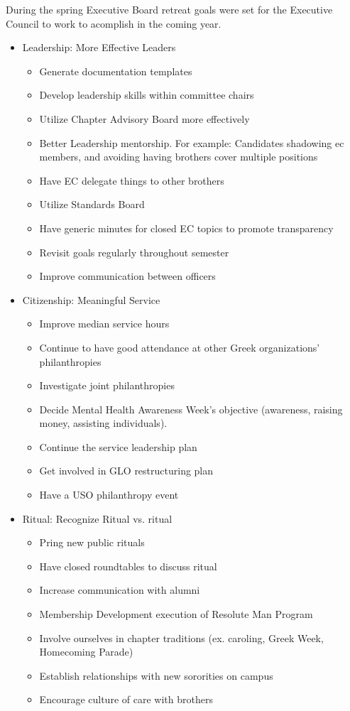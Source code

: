	During the spring Executive Board retreat goals were set for the Executive Council to work to acomplish in the coming year. 
	\begin{itemize}
		\item Leadership: More Effective Leaders
		  \begin{itemize}
		   \item Generate documentation templates
		   \item Develop leadership skills within committee chairs
		   \item Utilize Chapter Advisory Board more effectively
		   \item Better Leadership mentorship. For example: Candidates shadowing ec members, and avoiding having brothers cover multiple positions
		   \item Have EC delegate things to other brothers
		   \item Utilize Standards Board
		   \item Have generic minutes for closed EC topics to promote transparency
		   \item Revisit goals regularly throughout semester
		   \item Improve communication between officers
		  \end{itemize}

		\item Citizenship: Meaningful Service
		  \begin{itemize}
		   \item Improve median service hours
		   \item Continue to have good attendance at other Greek organizations' philanthropies
		   \item Investigate joint philanthropies
		   \item Decide Mental Health Awareness Week's objective (awareness, raising money, assisting individuals).
		   \item Continue the service leadership plan
		   \item Get involved in GLO restructuring plan
		   \item Have a USO philanthropy event
		  \end{itemize}

		\item Ritual: Recognize Ritual vs. ritual
		  \begin{itemize}
		   \item Pring new public rituals
		   \item Have closed roundtables to discuss ritual
		   \item Increase communication with alumni
		   \item Membership Development execution of Resolute Man Program
		   \item Involve ourselves in chapter traditions (ex. caroling, Greek Week, Homecoming Parade)
		   \item Establish relationships with new sororities on campus
		   \item Encourage culture of care with brothers
		  \end{itemize}
		  

\end{itemize}
